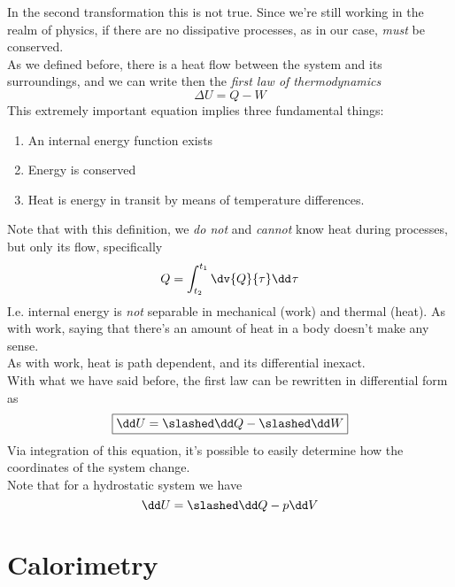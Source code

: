\documentclass[../qm.tex]{subfiles}
\begin{document}
In the second transformation this is not true. Since we're still working in the realm of physics, if there are no dissipative processes, as in our case, \textit{must} be conserved.\\
As we defined before, there is a heat flow between the system and its surroundings, and we can write then the \textit{first law of thermodynamics}
\begin{equation}
	\boxed{\Delta U = Q - W}
	\label{eq:firstlaw}
\end{equation}
This extremely important equation implies three fundamental things:
\begin{enumerate}
\item An internal energy function exists
\item Energy is conserved
\item Heat is energy in transit by means of temperature differences.
\end{enumerate}
Note that with this definition, we \textit{do not} and \textit{cannot} know heat during processes, but only its flow, specifically
\begin{equation*}
	Q=\int_{t_2}^{t_1}\dv{Q}{\tau}\dd^{}{\tau}
\end{equation*}
I.e. internal energy is \textit{not} separable in mechanical (work) and thermal (heat). As with work, saying that there's an amount of heat in a body doesn't make any sense.\\
As with work, heat is path dependent, and its differential inexact.\\
With what we have said before, the first law can be rewritten in differential form as
\begin{equation}
	\boxed{\dd U=\slashed\dd Q-\slashed\dd W}
	\label{eq:1stdiff.1}
\end{equation}
Via integration of this equation, it's possible to easily determine how the coordinates of the system change.\\
Note that for a hydrostatic system we have
\begin{equation*}
	\dd U = \slashed\dd Q-p\dd V
\end{equation*}
\section{Calorimetry}
\end{document}
